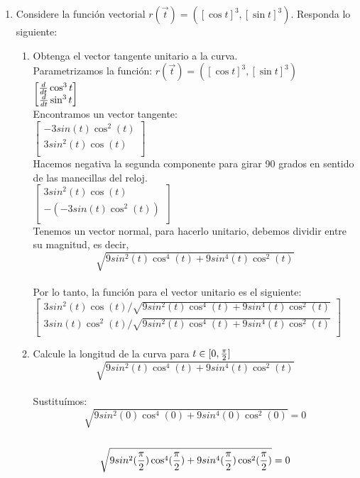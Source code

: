 \documentclass[10pt,letterpaper,fleqn]{article}
\begin{document}
\begin{enumerate}
        \item Considere la función vectorial $r(\overrightarrow{t})= ([\cos t]^3,[\sin t]^3)$. Responda lo siguiente:
        \begin{enumerate}
            \item Obtenga el vector tangente unitario a la curva. \\
            Parametrizamos la función:
            $r(\overrightarrow{t})= ([\cos t]^3,[\sin t]^3)$ \\
            $\begin{bmatrix}
            {d \over dt} \cos^3 t \\
            {d \over dt} \sin^3 t \\
            \end{bmatrix}$ \\
            Encontramos un vector tangente: \\
            $\begin{bmatrix}
            -3sin(t)\cos^2(t) \\
            3sin^2(t)\cos(t) \\
            \end{bmatrix}$ \\
            Hacemos negativa la segunda componente para girar 90 grados en sentido de las manecillas del reloj. \\
            $\begin{bmatrix}
            3sin^2(t)\cos(t) \\
            -(-3sin(t)\cos^2(t))\\
            \end{bmatrix}$ \\
            Tenemos un vector normal, para hacerlo unitario, debemos dividir entre su magnitud, es decir, \\
            $$\sqrt{9sin^2(t)\cos^4(t)+9sin^4(t)\cos^2(t)}$$ \\
            Por lo tanto, la función para el vector unitario es el siguiente: \\
            $\begin{bmatrix}
            3sin^2(t)\cos(t) / \sqrt{9sin^2(t)\cos^4(t)+9sin^4(t)\cos^2(t)} \\
            3sin(t)\cos^2(t) / \sqrt{9sin^2(t)\cos^4(t)+9sin^4(t)\cos^2(t)}\\
            \end{bmatrix}$ \\
            \item Calcule la longitud de la curva para $t \in [0,{\pi \over 2}]$ \\
            $$\sqrt{9sin^2(t)\cos^4(t)+9sin^4(t)\cos^2(t)}$$ \\
            Sustituímos: \\
            $$\sqrt{9sin^2(0)\cos^4(0)+9sin^4(0)\cos^2(0)} = 0$$ \\
            $$\sqrt{9sin^2({\pi \over 2})\cos^4({\pi \over 2})+9sin^4({\pi \over 2})\cos^2({\pi \over 2})} = 0$$
        \end{enumerate}


\end{enumerate}
\end{document}
